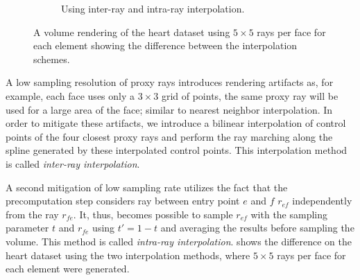 \begin{figure}
\begin{subfigure}[b]{0.4\textwidth}
    \caption{Using inter-ray and intra-ray interpolation.}
    \label{contributions:fem:interpolation}
\end{subfigure}
\caption{A volume rendering of the heart dataset using $5\times 5$ rays per face for each element showing the difference between the interpolation schemes.}
\label{contributions:fem:interpolationexample}
\end{figure}

A low sampling resolution of proxy rays introduces rendering artifacts as, for example, each face uses only a $3 \times 3$ grid of points, the same proxy ray will be used for a large area of the face; similar to nearest neighbor interpolation.  In order to mitigate these artifacts, we introduce a bilinear interpolation of control points of the four closest proxy rays and perform the ray marching along the spline generated by these interpolated control points.  This interpolation method is called \emph{inter-ray interpolation}.

A second mitigation of low sampling rate utilizes the fact that the precomputation step considers ray between entry point $e$ and $f$ $r_{ef}$ independently from the ray $r_{fe}$.  It, thus, becomes possible to sample $r_{ef}$ with the sampling parameter $t$ and $r_{fe}$ using $t' = 1 - t$ and averaging the results before sampling the volume.  This method is called \emph{intra-ray interpolation}.   shows the difference on the heart dataset using the two interpolation methods, where $5\times 5$ rays per face for each element were generated.






